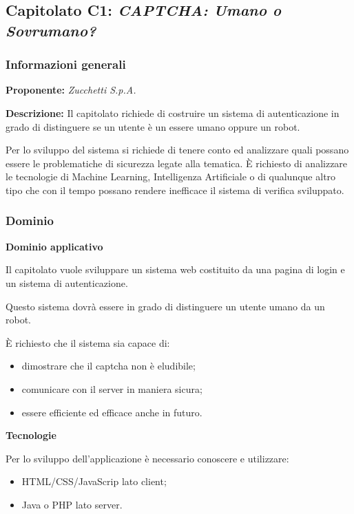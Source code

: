 \subsection{Capitolato C1: \textit{CAPTCHA: Umano o Sovrumano?}}

\subsubsection{Informazioni generali}

\textbf{Proponente:} \textit{Zucchetti S.p.A.}

\textbf{Descrizione:}
Il capitolato richiede di costruire un sistema di autenticazione in grado di distinguere se un utente è un essere umano oppure un robot.

Per lo sviluppo del sistema si richiede di tenere conto ed analizzare quali possano essere le problematiche di sicurezza legate alla tematica. È richiesto di analizzare le tecnologie di Machine Learning, Intelligenza Artificiale o di qualunque altro tipo che con il tempo possano rendere inefficace il sistema di verifica sviluppato.

\subsubsection{Dominio}

\textbf{Dominio applicativo}

Il capitolato vuole sviluppare un sistema web costituito da una pagina di login e un sistema di autenticazione.

Questo sistema dovrà essere in grado di distinguere un utente umano da un robot.

È richiesto che il sistema sia capace di:
\begin{itemize}
    \item dimostrare che il captcha non è eludibile;
    \item comunicare con il server in maniera sicura;
    \item essere efficiente ed efficace anche in futuro.
\end{itemize}

\textbf{Tecnologie}

Per lo sviluppo dell'applicazione è necessario conoscere e utilizzare:
\begin{itemize}
    \item HTML/CSS/JavaScrip lato client;
    \item Java o PHP lato server.
\end{itemize}

